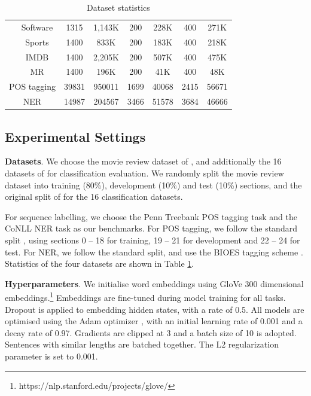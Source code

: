 \documentclass[11pt,a4paper]{article}
\begin{document}
\begin{table}[t]
\begin{tabular}{|ccc|c|c|c|c|c|c|}
		  & \multicolumn{2}{|c|}{Software}& 1315 &1,143K&200&228K&400&271K\\
		  & \multicolumn{2}{|c|}{Sports}& 1400 &833K&200&183K&400&218K\\
		  & \multicolumn{2}{|c|}{IMDB}& 1400 &2,205K&200&507K&400&475K\\
		  & \multicolumn{2}{|c|}{MR}& 1400 &196K&200&41K&400&48K\\
		\hline
		\multicolumn{3}{|c|}{POS tagging \cite{marcus1993building}}&39831&950011&1699&40068&2415&56671\\
		\hline
		\multicolumn{3}{|c|}{NER \cite{tjong2003introduction}}&14987&204567 &3466&51578&3684&46666\\
		
		\hline
	\end{tabular}
	\caption{\label{dataset_statistics}Dataset statistics}
\end{table}


\subsection{Experimental Settings}
{\bf Datasets}. We choose the movie review dataset of , and additionally the 16 datasets of  for classification evaluation. 
We randomly split the movie review dataset into training (80\%), development (10\%) and test (10\%) sections, and the original split of  for the 16 classification datasets. 


For sequence labelling, we choose the Penn Treebank \cite{marcus1993building} POS tagging task and the CoNLL \cite{tjong2003introduction} NER task as our benchmarks. 
For POS tagging, we follow the standard split \cite{manning2011part}, using sections 0 -- 18 for training, 19 -- 21 for development and 22 -- 24 for test. 
For NER, we follow the standard split, and use the BIOES tagging scheme \cite{ratinov2009design}. 
Statistics of the four datasets are shown in Table \ref{dataset_statistics}. 


{\bf Hyperparameters}. We initialise word embeddings using GloVe \cite{pennington2014glove} 300 dimensional embeddings.\footnote{https://nlp.stanford.edu/projects/glove/}
Embeddings are fine-tuned during model training for all tasks. 
Dropout \cite{srivastava2014dropout} is applied to embedding hidden states, with a rate of 0.5. 
All models are optimised using the Adam optimizer \cite{kingma2014adam}, with an initial learning rate of 0.001 and a decay rate of 0.97. Gradients are clipped at 3 and a batch size of 10 is adopted. 
Sentences with similar lengths are batched together.
The L2 regularization parameter is set to 0.001.
\end{document}
